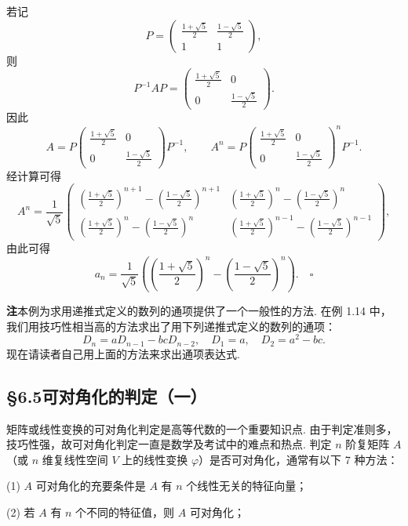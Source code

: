 \documentclass[UTF8, 12pt, fontset=fandol, oneside]{ctexart}
\begin{document}
若记
\[
P=\left(\begin{array}{cc}
\frac{1+\sqrt{5}}{2} & \frac{1-\sqrt{5}}{2}\\
1 & 1
\end{array}\right),
\]
则
\[
P^{-1}AP=\left(\begin{array}{cc}
\frac{1+\sqrt{5}}{2} & 0\\
0 & \frac{1-\sqrt{5}}{2}
\end{array}\right).
\]
因此
\[
A=P\left(\begin{array}{cc}
\frac{1+\sqrt{5}}{2} & 0\\
0 & \frac{1-\sqrt{5}}{2}
\end{array}\right)P^{-1},\qquad
A^n=P\left(\begin{array}{cc}
\frac{1+\sqrt{5}}{2} & 0\\
0 & \frac{1-\sqrt{5}}{2}
\end{array}\right)^nP^{-1}.
\]
经计算可得
\[
A^n=\frac{1}{\sqrt{5}}\left(\begin{array}{cc}
\left(\frac{1+\sqrt{5}}{2}\right)^{n+1}-\left(\frac{1-\sqrt{5}}{2}\right)^{n+1}
&
\left(\frac{1+\sqrt{5}}{2}\right)^n-\left(\frac{1-\sqrt{5}}{2}\right)^n\\
\left(\frac{1+\sqrt{5}}{2}\right)^n-\left(\frac{1-\sqrt{5}}{2}\right)^n
&
\left(\frac{1+\sqrt{5}}{2}\right)^{n-1}-\left(\frac{1-\sqrt{5}}{2}\right)^{n-1}
\end{array}\right),
\]
由此可得
\[
a_n=\frac{1}{\sqrt{5}}\left(\left(\frac{1+\sqrt{5}}{2}\right)^n-\left(\frac{1-\sqrt{5}}{2}\right)^n\right). \quad \square
\]

\noindent\textbf{注}\quad 本例为求用递推式定义的数列的通项提供了一个一般性的方法. 在例 1.14 中，我们用技巧性相当高的方法求出了用下列递推式定义的数列的通项：
\[
D_n=aD_{n-1}-bcD_{n-2},\quad D_1=a,\quad D_2=a^2-bc.
\]
现在请读者自己用上面的方法来求出通项表达式.

\subsection*{§6.5\quad 可对角化的判定（一）}

矩阵或线性变换的可对角化判定是高等代数的一个重要知识点. 由于判定准则多，技巧性强，故可对角化判定一直是数学及考试中的难点和热点. 判定 $n$ 阶复矩阵 $A$（或 $n$ 维复线性空间 $V$ 上的线性变换 $\varphi$）是否可对角化，通常有以下 7 种方法：

(1) $A$ 可对角化的充要条件是 $A$ 有 $n$ 个线性无关的特征向量；

(2) 若 $A$ 有 $n$ 个不同的特征值，则 $A$ 可对角化；
\end{document}
